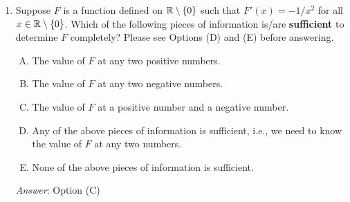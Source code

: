 \documentclass[10pt]{amsart}
\begin{document}
\begin{enumerate}
  {\em Explanation}: Suppose $G$ is an antiderivative for $f$. The
  general expression for an antiderivative is $G + C$, where $C$ is
  constant. We see that for options (b), (c), and (d), it is always
  possible to solve the equation we obtain to get one or more real
  values of $C$. However, (a) simplifies to $G(1) + C = G(0) + C$,
  whereby $C$ is canceled, and we are left with the statement $G(1) =
  G(0)$. If this statement is true, then {\em all} choices of $C$
  work, and if it is false, then {\em none} works. Since we cannot
  guarantee the truth of the statement, (a) is the exceptional
  condition.

  Another way of thinking about this is that $F(1) - F(0) = \int_0^1
  f(x) \, dx$, regardless of the choice of $F$. If this integral is
  $0$, then any antiderivative works. If it is not zero, no
  antiderivative works.

  {\em Performance review}: $18$ out of $24$ got this. $3$ chose (C),
  $2$ chose (E), $1$ chose (B).

  {\em Historical note 1}: $2$ out of $20$ people got this
  correct. $10$ chose (E), $4$ chose (D), $3$ chose (C), $1$ chose
  (B).
  
  {\em Historical note 2}: In the last appearance in a 153 quiz, $10$
  out of $28$ people got this correct. $6$ people chose (B), $5$
  people chose (E), $4$ people chose (D), $2$ people chose (C), and
  $1$ person left the question blank.
\item Suppose $F$ is a function defined on $\mathbb{R} \setminus \{ 0 \}$ such
  that $F'(x) = -1/x^2$ for all $x \in \mathbb{R} \setminus \{ 0 \}$. Which of
  the following pieces of information is/are {\bf sufficient} to determine
  $F$ completely? Please see Options (D) and (E) before answering.
  \begin{enumerate}[(A)]
  \item The value of $F$ at any two positive numbers.
  \item The value of $F$ at any two negative numbers.
  \item The value of $F$ at a positive number and a negative number.
  \item Any of the above pieces of information is sufficient, i.e., we
    need to know the value of $F$ at any two numbers.
  \item None of the above pieces of information is sufficient.
  \end{enumerate}

  {\em Answer}: Option (C)


\end{enumerate}
\end{document}
